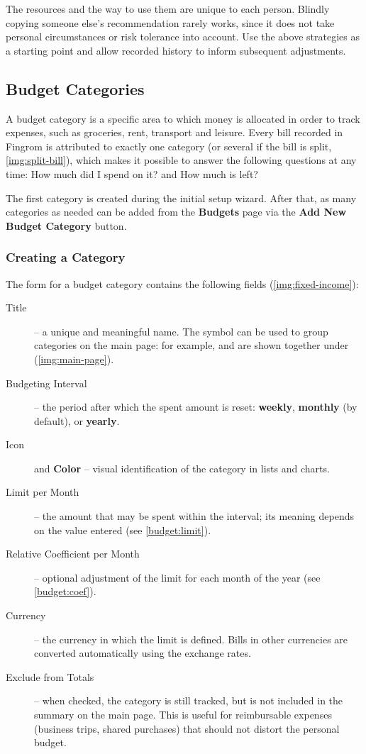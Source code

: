 \noindent The resources and the way to use them are unique to each person. Blindly copying
someone else's recommendation rarely works, since it does not take personal circumstances or
risk tolerance into account. Use the above strategies as a starting point and allow recorded
history to inform subsequent adjustments.


\subsection{Budget Categories}

A budget category is a specific area to which money is allocated in order to track expenses,
such as groceries, rent, transport and leisure. Every bill recorded in Fingrom is attributed
to exactly one category (or several if the bill is split, \cref{img:split-bill}), which makes
it possible to answer the following questions at any time: How much did I spend on it? and
How much is left?


\noindent The first category is created during the initial setup wizard. After that, as many
categories as needed can be added from the \textbf{Budgets} page via the \textbf{Add New
Budget Category} button.

\newpage
\subsubsection{Creating a Category}

The form for a budget category contains the following fields (\cref{img:fixed-income}):

\begin{description}
  \item[Title] -- a unique and meaningful name. The \q{/} symbol can be used to group
  categories on the main page: for example,  and  are
  shown together under  (\cref{img:main-page}).
  \item[Budgeting Interval] -- the period after which the spent amount is reset:
  \textbf{weekly}, \textbf{monthly} (by default), or \textbf{yearly}.
  \item[Icon] and \textbf{Color} -- visual identification of the category in lists and charts.
  \item[Limit per Month] -- the amount that may be spent within the interval; its meaning
  depends on the value entered (see \cref{budget:limit}).
  \item[Relative Coefficient per Month] -- optional adjustment of the limit for each month of
  the year (see \cref{budget:coef}).
  \item[Currency] -- the currency in which the limit is defined. Bills in other currencies
  are converted automatically using the exchange rates.
  \item[Exclude from Totals] -- when checked, the category is still tracked, but is not
  included in the summary on the main page. This is useful for reimbursable expenses
  (business trips, shared purchases) that should not distort the personal budget.
\end{description}

